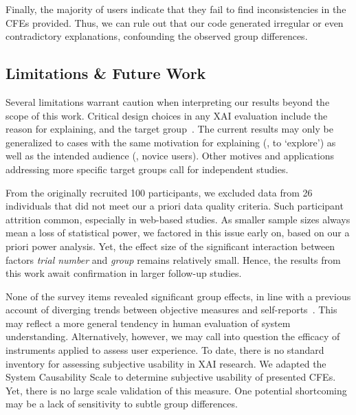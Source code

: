 Finally, the majority of users indicate that they fail to find inconsistencies in the \glspl{CFE} provided.
Thus, we can rule out that our code generated irregular or even contradictory explanations, confounding the observed group differences.

\subsection{Limitations \& Future Work}\label{subsec:limitations-future-work}

Several limitations warrant caution when interpreting our results beyond the scope of this work.
Critical design choices in any \gls{XAI} evaluation include the reason for explaining, and the target group~\cite{adadi_peeking_2018}.
The current results may only be generalized to cases with the same motivation for explaining (\ie, to `explore') as well as the intended audience (\ie, novice users).
Other motives and applications addressing more specific target groups call for independent studies.

From the originally recruited 100 participants, we excluded data from 26 individuals that did not meet our a priori data quality criteria.
Such participant attrition common, especially in web-based studies. 
As smaller sample sizes always mean a loss of statistical power, we factored in this issue early on, based on our a priori power analysis. 
Yet, the effect size of the significant interaction between factors \textit{trial number} and \textit{group} remains relatively small. 
Hence, the results from this work await confirmation in larger follow-up studies.
 
None of the survey items revealed significant group effects, in line with a previous account of diverging trends between objective measures and self-reports~\citep{van_der_waa_evaluating_2021}. 
This may reflect a more general tendency in human evaluation of system understanding.
Alternatively, however, we may call into question the efficacy of instruments applied to assess user experience. 
To date, there is no standard inventory for assessing subjective usability in \gls{XAI} research.
We adapted the System Causability Scale \cite{holzinger_measuring_2020} to determine subjective usability of presented \glspl{CFE}.
Yet, there is no large scale validation of this measure.
One potential shortcoming may be a lack of sensitivity to subtle group differences.

